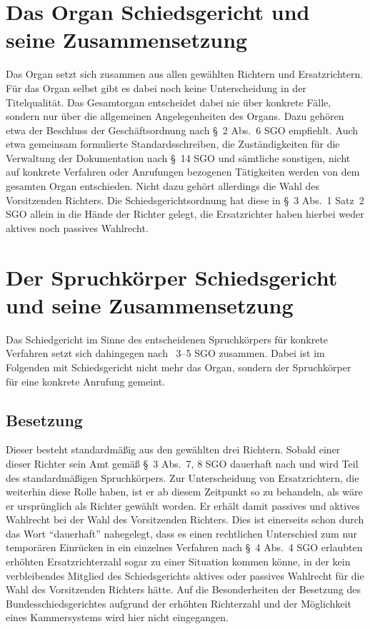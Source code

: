\section{Das Organ Schiedsgericht und seine Zusammensetzung}
\label{Zusammensetzung:Organ}
Das Organ setzt sich zusammen aus allen gewählten Richtern und Ersatzrichtern.
Für das Organ selbst gibt es dabei noch keine Unterscheidung in der Titelqualität.
Das Gesamtorgan entscheidet dabei nie über konkrete Fälle, sondern nur über die allgemeinen Angelegenheiten des Organs.
Dazu gehören etwa der Beschluss der Geschäftsordnung nach \S~2 Abs.~6 SGO empfiehlt.
Auch etwa gemeinsam formulierte Standardsschreiben, die Zuständigkeiten für die Verwaltung der Dokumentation nach \S~14 SGO und sämtliche sonstigen, nicht auf konkrete Verfahren oder Anrufungen bezogenen Tätigkeiten werden von dem gesamten Organ entschieden.
Nicht dazu gehört allerdings die Wahl des Vorsitzenden Richters.
Die Schiedsgerichtsordnung hat diese in \S~3 Abs.~1 Satz~2 SGO allein in die Hände der Richter gelegt, die Ersatzrichter haben hierbei weder aktives noch passives Wahlrecht.

\section{Der Spruchkörper Schiedsgericht und seine Zusammensetzung}
\label{Zusammensetzung:Spruchkoerper}
Das Schiedgericht im Sinne des entscheidenen Spruchkörpers für konkrete Verfahren setzt sich dahingegen nach \SSS~3--5 SGO zusammen. Dabei ist im Folgenden mit Schiedsgericht nicht mehr das Organ, sondern der Spruchkörper für eine konkrete Anrufung gemeint.

\subsection{Besetzung}
\label{Zusammensetzung:Spruchkoerper:Besetzung}
Dieser besteht standardmäßig aus den gewählten drei Richtern.
Sobald einer dieser Richter sein Amt gemäß \S~3 Abs.~7, 8 SGO dauerhaft nach und wird Teil des standardmäßigen Spruchkörpers.
Zur Unterscheidung von Ersatzrichtern, die weiterhin diese Rolle haben, ist er ab diesem Zeitpunkt so zu behandeln, als wäre er ursprünglich als Richter gewählt worden.
Er erhält damit passives und aktives Wahlrecht bei der Wahl des Vorsitzenden Richters.
Dies ist einerseits schon durch das Wort \enquote{dauerhaft} nahegelegt, dass es einen rechtlichen Unterschied zum nur temporären Einrücken in ein einzelnes Verfahren nach \S~4 Abs.~4 SGO erlaubten erhöhten Ersatzrichterzahl sogar zu einer Situation kommen könne, in der kein verbleibendes Mitglied des Schiedsgerichts aktives oder passives Wahlrecht für die Wahl des Vorsitzenden Richters hätte.
Auf die Besonderheiten der Besetzung des Bundesschiedsgerichtes aufgrund der erhöhten Richterzahl und der Möglichkeit eines Kammersystems wird hier nicht eingegangen.

